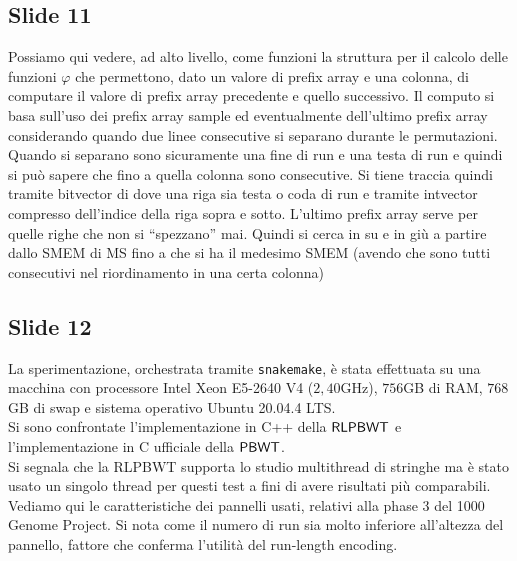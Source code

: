\documentclass[a4paper,11pt, oneside,italian]{article}
\def\PBWT{\mbox{\rm {\sf PBWT}}}
\def\RLPBWT{\mbox{\rm {\sf RLPBWT}}}
\begin{document}
\subsection*{Slide 11}
Possiamo qui vedere, ad alto livello, come funzioni la struttura per il calcolo
delle funzioni $\varphi$ che permettono, dato un valore di prefix array e una
colonna, di computare il valore di prefix array precedente e quello
successivo. Il computo si basa sull'uso dei prefix array sample ed eventualmente
dell'ultimo prefix array considerando quando due linee consecutive si separano
durante le permutazioni. Quando si separano sono sicuramente una fine di run e
una testa di run e quindi si può sapere che fino a quella colonna sono
consecutive. Si tiene traccia quindi tramite bitvector di dove una riga sia
testa o coda di run e tramite intvector compresso dell'indice della riga sopra e
sotto. L'ultimo prefix array serve per quelle righe che non si ``spezzano'' mai.
Quindi si cerca in su e in giù a partire dallo SMEM di MS fino a che si ha il
medesimo SMEM (avendo che sono tutti consecutivi nel riordinamento in una certa
colonna)
\subsection*{Slide 12}
La sperimentazione, orchestrata tramite \texttt{snakemake}, è stata
effettuata su una macchina con processore 
Intel Xeon E5-2640 V4 ($2,40$GHz), $756$GB di RAM, $768$GB di swap e
sistema operativo Ubuntu 20.04.4 LTS.\\
Si sono confrontate l'implementazione in C++ della $\RLPBWT$ e
l'implementazione in C ufficiale della $\PBWT$.\\
Si segnala che la RLPBWT supporta lo studio multithread di stringhe ma è stato
usato un singolo thread per questi test a fini di avere risultati più
comparabili.\\
Vediamo qui le caratteristiche dei pannelli usati, relativi alla phase 3 del
1000 Genome Project. Si nota come il numero di run sia molto inferiore
all'altezza del pannello, fattore che conferma l'utilità del run-length
encoding.
\end{document}
